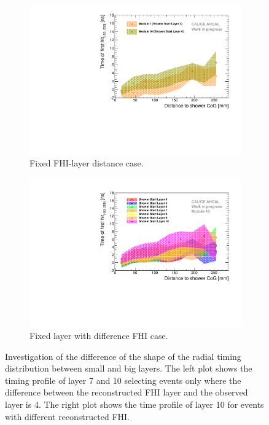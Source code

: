 \begin{figure}[htbp!]
	\begin{subfigure}[t]{0.5\textwidth}
		\centering
		\includegraphics[width=1\textwidth]{../Thesis_Plots/Timing/Pions/Plots/Timing_Radius_Comparison_ShortAsymRange_ShowerStart.pdf}
		\caption{Fixed FHI-layer distance case.}\label{fig:Radius_FHI}
	\end{subfigure}
	\hfill
	\begin{subfigure}[t]{0.5\textwidth}
		\centering
		\includegraphics[width=1\textwidth]{../Thesis_Plots/Timing/Pions/Plots/Timing_Radius_Comparison_ShortAsymRange_ShowerStart_FixedModule.pdf}
		\caption{Fixed layer with difference FHI case.}\label{fig:Radius_FHI_Fixed}
	\end{subfigure}
	\caption{Investigation of the difference of the shape of the radial timing distribution between small and big layers. The left plot shows the timing profile of layer 7 and 10 selecting events only where the difference between the reconstructed FHI layer and the observed layer is 4. The right plot shows the time profile of layer 10 for events with different reconstructed FHI.}
	\label{fig:Radius_FHI}
\end{figure}

